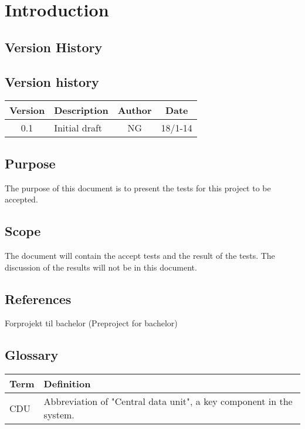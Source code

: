 \chapter{Introduction}
\section{Version History}
\section{Version history}
\begin{table}[H]
\begin{tabular}{|c|p{9cm}|c|c|}
\hline
Version & Description & Author & Date\\
\hline
0.1 & Initial draft & NG & 18/1-14\\
\hline
\end{tabular}
\end{table}

\section{Purpose}
The purpose of this document is to present the tests for this project to be accepted.

\section{Scope}
The document will contain the accept tests and the result of the tests. The discussion of the results will not be in this document.

\section{References}
Forprojekt til bachelor (Preproject for bachelor)

\section{Glossary}
\begin{table}[H]
\centering
\begin{tabular}{|p{4cm}|p{7cm}|}
\hline
Term & Definition\\ \hline
CDU & Abbreviation of "Central data unit", a key component in the system. \\ \hline
\end{tabular}
\end{table}
